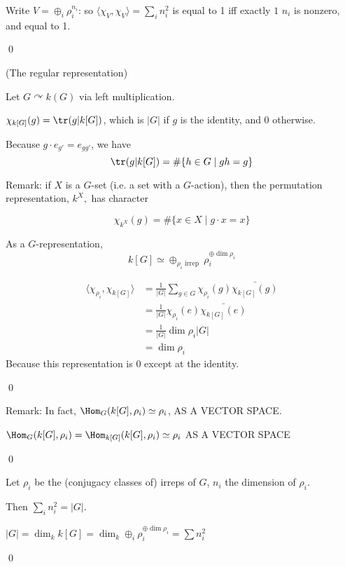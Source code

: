 \documentclass[x11names,reqno,14pt]{extarticle}
\begin{document}
\proof

Write $V = \oplus_i\rho_i^{n_i}$: so $\langle\chi_V,\chi_V\rangle = \sum_in_i^2$ is equal to 1 iff exactly $1$ $n_i$ is nonzero, and equal to 1. 

\qed

\exm(The regular representation)

Let $G \curvearrowright k(G)$ via left multiplication. 

$\chi_{k[G]}(g) = \tr(g|k[G])$, which is $|G|$ if $g$ is the identity, and 0 otherwise. 

Because $g\cdot e_{g'} = e_{gg'}$, we have
\[
\tr(g|k[G]) = \#\{h\in G \mid gh = g\}
\]

Remark: if $X$ is a $G$-set (i.e. a set with a $G$-action), then the permutation representation, $k^X,$ has character 

\[
\chi_{k^X}(g) = \#\{x\in X \mid g\cdot x = x\}
\]

\cor

As a $G$-representation, 
\[
k[G] \simeq \oplus_{\rho_i\text{ irrep }}\rho_i^{\oplus\dim\rho_i}
\]

\proof

\begin{align*}
\langle\chi_{\rho_i},\chi_{k[G]}\rangle & = \frac{1}{|G|}\sum_{g\in G}\chi_{\rho_i}(g)\bar{\chi_{k[G]}(g)} \\
& = \frac{1}{|G|}\chi_{\rho_i}(e)\bar{\chi_{k[G]}(e)} \\
& = \frac{1}{|G|}\dim\rho_i |G| \\
& = \dim\rho_i
\end{align*}
Because this representation is 0 except at the identity. 

\qed

Remark: In fact, $\Hom_G(k[G],\rho_i)\simeq\rho_i$, AS A VECTOR SPACE.

\proof

$\Hom_G(k[G],\rho_i) = \Hom_{k[G]}(k[G],\rho_i) \simeq \rho_i$ AS A VECTOR SPACE

\qed

\cor

Let $\rho_i$ be the (conjugacy classes of) irreps of $G$, $n_i$ the dimension of $\rho_i$. 

Then $\sum_in_i^2= |G|$. 

\proof

$|G| = \dim_kk[G] = \dim_k\oplus_i\rho_i^{\oplus\dim\rho_i} = \sum n_i^2$

\qed

\thm
\end{document}
